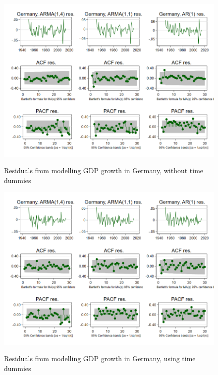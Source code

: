\begin{figure}[H]
  \vspace{-0.5cm}
  \centering
  \caption{Residuals from modelling GDP growth in Germany, without time dummies}
    \includegraphics[width= \textwidth]{03_figures/fig23d_A1}
  \label{fig:residuals_no_dummies}
  \vspace{-1.cm}
\end{figure}
\begin{figure}[H]
  \centering
  \caption{Residuals from modelling GDP growth in Germany, using time dummies}
    \includegraphics[width= \textwidth]{03_figures/fig23d_A2}
  \label{fig:residuals_dummies}
  \vspace{-2.cm}
\end{figure}
